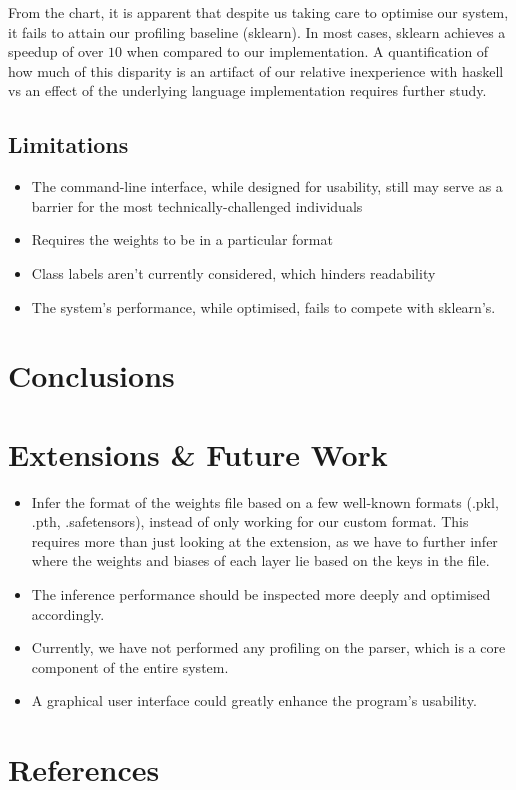 \documentclass[12pt, titlepage]{article}
\begin{document}
From the chart, it is apparent that despite us taking care to optimise our system, it fails to attain our profiling baseline (sklearn). In most cases, sklearn achieves a speedup of over $10$ when compared to our implementation. A quantification of how much of this disparity is an artifact of our relative inexperience with haskell vs an effect of the underlying language implementation requires further study.

\subsection{Limitations}
\begin{itemize}
	\item The command-line interface, while designed for usability, still may serve as a barrier for the most technically-challenged individuals
	\item Requires the weights to be in a particular format
	\item Class labels aren't currently considered, which hinders readability
	\item The system's performance, while optimised, fails to compete with sklearn's.
\end{itemize}

\section{Conclusions}

\section{Extensions \& Future Work}
\begin{itemize}
	\item Infer the format of the weights file based on a few well-known formats (.pkl, .pth, .safetensors), instead of only working for our custom format. This requires more than just looking at the extension, as we have to further infer where the weights and biases of each layer lie based on the keys in the file. 
	\item The inference performance should be inspected more deeply and optimised accordingly.
	\item Currently, we have not performed any profiling on the parser, which is a core component of the entire system.
	\item A graphical user interface could greatly enhance the program's usability.
\end{itemize}

\section{References}
\end{document}
